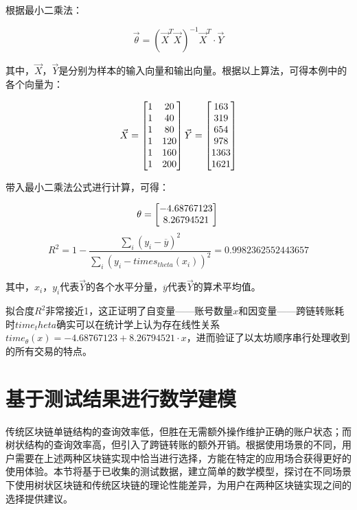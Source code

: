 根据最小二乘法：

$$
    \vec{\theta} = (\vec{X}^T \vec{X})^{-1}\vec{X}^T \cdot \vec{Y}
$$

其中，$\vec{X}$，$\vec{Y}$是分别为样本的输入向量和输出向量。根据以上算法，可得本例中的各个向量为：

$$
    \vec{X} = \begin{bmatrix}
        1 & 20 \\ 1 & 40 \\ 1 & 80 \\ 1 & 120 \\ 1 & 160 \\ 1 & 200
    \end{bmatrix} \\
    \vec{Y} = \begin{bmatrix}
        163 \\ 319 \\ 654 \\ 978 \\ 1363 \\ 1621
    \end{bmatrix}
$$

带入最小二乘法公式进行计算，可得：

$$
    \theta = \begin{bmatrix}
        -4.68767123 \\
        8.26794521
    \end{bmatrix} \\
$$
$$
    R^2 = 1 - \frac{\sum_i (y_i - \overline{y})^2}{\sum_i (y_i - times_{theta}(x_i))^2} = 0.9982362552443657
$$

其中，$x_i$，$y_i$代表$\vec{Y}$的各个水平分量，$\overline{y}$代表$\vec{Y}$的算术平均值。

拟合度$R^2$非常接近1，这正证明了自变量——账号数量$x$和因变量——跨链转账耗时$time_theta$确实可以在统计学上认为存在线性关系$time_{\theta}(x) = -4.68767123 + 8.26794521 \cdot x$，进而验证了以太坊顺序串行处理收到的所有交易的特点。

\section{基于测试结果进行数学建模}

传统区块链单链结构的查询效率低，但胜在无需额外操作维护正确的账户状态；而树状结构的查询效率高，但引入了跨链转账的额外开销。根据使用场景的不同，用户需要在上述两种区块链实现中恰当进行选择，方能在特定的应用场合获得更好的使用体验。本节将基于已收集的测试数据，建立简单的数学模型，探讨在不同场景下使用树状区块链和传统区块链的理论性能差异，为用户在两种区块链实现之间的选择提供建议。

